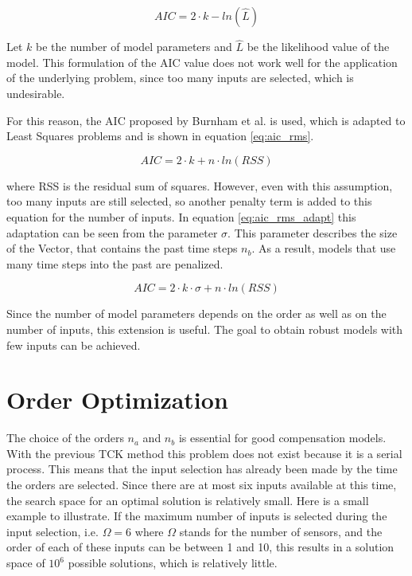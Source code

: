  \begin{equation}
	AIC = 2 \cdot k-ln(\hat{L})
	\label{eq:aic_general}
\end{equation}
	
Let $k$ be the number of model parameters and $\hat{L}$ be the likelihood value of the model. This formulation of the AIC value does not work well for the application of the underlying problem, since too many inputs are selected, which is undesirable. 

For this reason, the AIC proposed by Burnham et al. \cite{Burnham_2004} is used, which is adapted to Least Squares problems and is shown in equation \ref{eq:aic_rms}.  

 \begin{equation}
	AIC = 2 \cdot k+n \cdot ln(RSS)
	\label{eq:aic_rms}
\end{equation}

where RSS is the residual sum of squares. However, even with this assumption, too many inputs are still selected, so another penalty term is added to this equation for the number of inputs. In equation \ref{eq:aic_rms_adapt} this adaptation can be seen from the parameter $\sigma$. This parameter describes the size of the Vector, that contains the past time steps $n_b$. As a result, models that use many time steps into the past are penalized.

 \begin{equation}
	AIC = 2 \cdot k \cdot \sigma + n \cdot ln(RSS)
	\label{eq:aic_rms_adapt}
\end{equation}

Since the number of model parameters depends on the order as well as on the number of inputs, this extension is useful. The goal to obtain robust models with few inputs can be achieved.

\section{Order Optimization}
\label{sec:order_opt}

The choice of the orders $n_a$ and $n_b$ is essential for good compensation models. With the previous TCK method this problem does not exist because it is a serial process. This means that the input selection has already been made by the time the orders are selected. Since there are at most six inputs available at this time, the search space for an optimal solution is relatively small. Here is a small example to illustrate. If the maximum number of inputs is selected during the input selection, i.e. $\Omega = 6$ where $\Omega$ stands for the number of sensors, and the order of each of these inputs can be between 1 and 10, this results in a solution space of $10 ^ 6$ possible solutions, which is relatively little.\\

